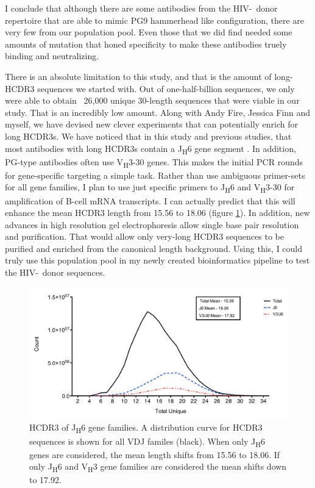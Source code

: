 I conclude that although there are some antibodies from the HIV-\naive~donor repertoire that are able to mimic PG9 hammerhead like configuration, there are very few from our population pool. Even those that we did find needed some amounts of mutation that honed specificity to make these antibodies truely binding and neutralizing.

There is an absolute limitation to this study, and that is the amount of long-HCDR3 sequences we started with. Out of one-half-billion sequences, we only were able to obtain ~26,000 unique 30-length sequences that were viable in our study. That is an incredibly low amount. Along with Andy Fire, Jessica Finn and myself, we have devised new clever experiments that can potentially enrich for long HCDR3s. We have noticed that in this study and previous studies, that most antibodies with long HCDR3s contain a J\textsubscript{H}6 gene segment \citep{Briney:2012ib}. In addition, PG-type antibodies often use V\textsubscript{H}3-30 genes. This makes the initial PCR rounds for gene-specific targeting a simple task. Rather than use ambiguous primer-sets for all gene families, I plan to use just specific primers to J\textsubscript{H}6 and V\textsubscript{H}3-30 for amplification of B-cell mRNA transcripts. I can actually predict that this will enhance the mean HCDR3 length from 15.56 to 18.06 (figure \ref{fig:fig5_3}). In addition, new advances in high resolution gel electrophoresis allow single base pair resolution and purification. That would allow only very-long HCDR3 sequences to be purified and enriched from the canonical length background. Using this, I could truly use this population pool in my newly created bioinformatics pipeline to test the HIV-\naive~donor sequences.

\begin{figure}[!t]
   \centering
   \includegraphics[width=.9\textwidth]{images/chapter5/figure5_3.pdf}
   \caption[HCDR3 of J\textsubscript{H}6 Gene Families]{HCDR3 of J\textsubscript{H}6 gene families. A distribution curve for HCDR3 sequences is shown for all VDJ familes (black). When only J\textsubscript{H}6 genes are considered, the mean length shifts from 15.56 to 18.06. If only J\textsubscript{H}6 and V\textsubscript{H}3 gene families are considered the mean shifts down to 17.92.}
       \label{fig:fig5_3}
\end{figure}

